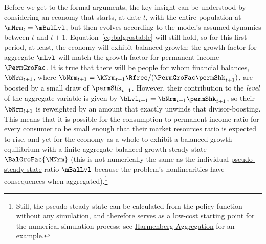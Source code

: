 \documentclass[BufferStockTheory]{subfiles}
\begin{document}
Before we get to the formal arguments, the key insight can be understood by considering an economy that starts, at date $t$, with the entire population at $\mNrm_{t}=\mBalLvl$, but then evolves according to the model's assumed dynamics between $t$ and $t+1$.  Equation~\eqref{eq:balgrostable} will still hold, so for this first period, at least, the economy will exhibit balanced growth: the growth factor for aggregate $\mLvl$ will match the growth factor for permanent income $\PermGroFac$.  It is true that there will be people for whom financial balances, $\bNrm_{t+1}$, where $\bNrm_{t+1} = \kNrm_{t+1}\Rfree/(\PermGroFac\permShk_{t+1})$, are boosted by a small draw of $\permShk_{t+1}$.  However, their contribution to the \textit{level} of the aggregate variable is given by $\bLvl_{t+1}=\bNrm_{t+1}\permShk_{t+1}$, so their $\bNrm_{t+1}$ is reweighted by an amount that exactly unwinds that divisor-boosting.  This means that it is possible for the consumption-to-permanent-income ratio for every consumer to be small enough that their market resources ratio is expected to rise, and yet for the economy as a whole to exhibit a balanced growth equilibrium with a finite aggregate balanced growth steady state $\BalGroFac{\MNrm}$ (this is not numerically the same as the individual \hyperlink{pseudo-steady-state}{pseudo-steady-state} ratio $\mBalLvl$ because the problem's nonlinearities have consequences when aggregated).\footnote{Still, the pseudo-steady-state can be calculated from the policy function without any simulation, and therefore serves as a low-cost starting point for the numerical simulation process; see \href{https://econ-ark.org/materials/harmenberg-aggregation?launch}{Harmenberg-Aggregation} for an example.}
\end{document}

